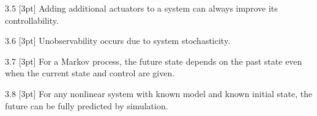 \solution{}

3.5 [3pt] Adding additional actuators to a system can always improve its controllability.

\solution{}

3.6 [3pt] Unobservability occurs due to system stochasticity.

\solution{}

3.7 [3pt] For a Markov process, the future state depends on the past state even when the current state and control are given.

\solution{}

3.8 [3pt] For any nonlinear system with known model and known initial state, the future can be fully predicted by simulation.

\solution{}
